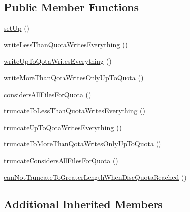 \subsection*{Public Member Functions}
\begin{DoxyCompactItemize}
\item 
\mbox{\hyperlink{classorg_1_1bovigo_1_1vfs_1_1vfs_stream_wrapper_quota_test_case_a0bc688732d2b3b162ffebaf7812e78da}{set\+Up}} ()
\item 
\mbox{\hyperlink{classorg_1_1bovigo_1_1vfs_1_1vfs_stream_wrapper_quota_test_case_a87fde312835da6ad5a01aa4cb30df827}{write\+Less\+Than\+Quota\+Writes\+Everything}} ()
\item 
\mbox{\hyperlink{classorg_1_1bovigo_1_1vfs_1_1vfs_stream_wrapper_quota_test_case_a162db754690a43cede0ca7ce6b399d0f}{write\+Up\+To\+Qota\+Writes\+Everything}} ()
\item 
\mbox{\hyperlink{classorg_1_1bovigo_1_1vfs_1_1vfs_stream_wrapper_quota_test_case_ac738056d5f49be8feca9c1f5ecde5362}{write\+More\+Than\+Qota\+Writes\+Only\+Up\+To\+Quota}} ()
\item 
\mbox{\hyperlink{classorg_1_1bovigo_1_1vfs_1_1vfs_stream_wrapper_quota_test_case_a1f4d23c5aefffa448ed843a4f2e55fcb}{considers\+All\+Files\+For\+Quota}} ()
\item 
\mbox{\hyperlink{classorg_1_1bovigo_1_1vfs_1_1vfs_stream_wrapper_quota_test_case_a339a9bb2796f0eeb488636dab4190c69}{truncate\+To\+Less\+Than\+Quota\+Writes\+Everything}} ()
\item 
\mbox{\hyperlink{classorg_1_1bovigo_1_1vfs_1_1vfs_stream_wrapper_quota_test_case_aed196a834eaa2e2850cc27933e04c0a3}{truncate\+Up\+To\+Qota\+Writes\+Everything}} ()
\item 
\mbox{\hyperlink{classorg_1_1bovigo_1_1vfs_1_1vfs_stream_wrapper_quota_test_case_ad11bb21f596363c3a2514d0650bccec5}{truncate\+To\+More\+Than\+Qota\+Writes\+Only\+Up\+To\+Quota}} ()
\item 
\mbox{\hyperlink{classorg_1_1bovigo_1_1vfs_1_1vfs_stream_wrapper_quota_test_case_a0e011cf46cdc9c12756ba7999e924f64}{truncate\+Considers\+All\+Files\+For\+Quota}} ()
\item 
\mbox{\hyperlink{classorg_1_1bovigo_1_1vfs_1_1vfs_stream_wrapper_quota_test_case_acda8f0eec642aa84a8f9fb10d5b21663}{can\+Not\+Truncate\+To\+Greater\+Length\+When\+Disc\+Quota\+Reached}} ()
\end{DoxyCompactItemize}
\subsection*{Additional Inherited Members}


